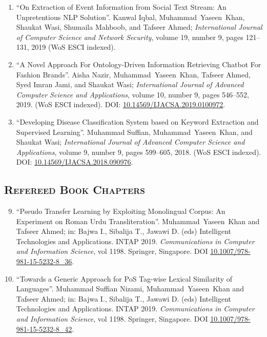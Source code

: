 \documentclass[a4paper, 10pt]{article}
\begin{document}
\begin{enumerate}
	\item ``On Extraction of Event Information from Social Text Stream: An Unpretentious NLP Solution''. Kanwal Iqbal, \textcolor{NavyBlue}{Muhammad~Yaseen~Khan}, Shaukat Wasi, Shumaila Mahboob, and Tafseer Ahmed; \emph{International Journal of Computer Science and Network Security}, volume 19, number 9, pages 121--131, 2019 (WoS ESCI indexed).
 
	\item ``A Novel Approach For Ontology-Driven Information Retrieving Chatbot For Fashion Brands''. Aisha Nazir, \textcolor{NavyBlue}{Muhammad~Yaseen~Khan}, Tafseer Ahmed, Syed Imran Jami, and Shaukat Wasi; \emph{International Journal of Advanced Computer Science and Applications}, volume 10, number 9, pages 546--552, 2019. (WoS ESCI indexed). DOI: \href{https://doi.org/10.14569/IJACSA.2019.0100972}{10.14569/IJACSA.2019.0100972}.
      
	\item ``Developing Disease Classification System based on Keyword Extraction and Supervised Learning''. Muhammad Suffian, \textcolor{NavyBlue}{Muhammad~Yaseen~Khan}, and Shaukat Wasi; \emph{International Journal of Advanced Computer Science and Applications}, volume 9, number 9, pages 599--605, 2018. (WoS ESCI indexed). DOI: \href{https://doi.org/10.14569/IJACSA.2018.090976}{10.14569/IJACSA.2018.090976}.
\end{enumerate}


\subsection*{\normalfont\textsc{Refereed Book Chapters}}
\begin{enumerate}
\setcounter{enumi}{8}
\itemsep-4pt 
 \item ``Pseudo Transfer Learning by Exploiting Monolingual Corpus: An Experiment on Roman Urdu Transliteration''. \textcolor{NavyBlue}{Muhammad~Yaseen~Khan} and Tafseer Ahmed; in: Bajwa I., Sibalija T., Jawawi D. (eds) Intelligent Technologies and Applications. INTAP 2019. \emph{Communications in Computer and Information Science}, vol 1198. Springer, Singapore. DOI \href{https://doi.org/10.1007/978-981-15-5232-8_36}{10.1007/978-981-15-5232-8\_36}.
  
   \item ``Towards a Generic Approach for PoS Tag-wise Lexical Similarity of Languages''. Muhammad Suffian Nizami, \textcolor{NavyBlue}{Muhammad~Yaseen~Khan} and Tafseer Ahmed; in: Bajwa I., Sibalija T., Jawawi D. (eds) Intelligent Technologies and Applications. INTAP 2019. \emph{Communications in Computer and Information Science}, vol 1198. Springer, Singapore. DOI \href{https://doi.org/10.1007/978-981-15-5232-8_42}{10.1007/978-981-15-5232-8\_42}.
   
 \end{enumerate}
\end{document}
